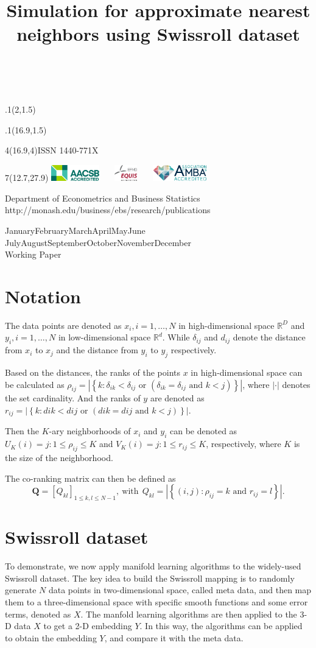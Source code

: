\documentclass[11pt,a4paper,]{article}
\title{Simulation for approximate nearest neighbors using Swissroll dataset}
\date{\sf\Date~\Month~\Year}
\makeatletter
\def\Date{\number\day}
\def\Month{\ifcase\month\or
 January\or February\or March\or April\or May\or June\or
 July\or August\or September\or October\or November\or December\fi}
\def\Year{\number\year}
\def\showjel{{\large\textsf{\textbf{JEL classification:}}~\@jel}}
\def\cover{{\sffamily\setcounter{page}{0}
        \thispagestyle{empty}
        \placefig{2}{1.5}{width=5cm}{monash2}
        \placefig{16.9}{1.5}{width=2.1cm}{MBusSchool}
        \begin{textblock}{4}(16.9,4)ISSN 1440-771X\end{textblock}
        \begin{textblock}{7}(12.7,27.9)\hfill
        \includegraphics[height=0.7cm]{AACSB}~~~
        \includegraphics[height=0.7cm]{EQUIS}~~~
        \includegraphics[height=0.7cm]{AMBA}
        \end{textblock}
        \vspace*{2cm}
        \begin{center}\Large
        Department of Econometrics and Business Statistics\\[.5cm]
        \footnotesize http://monash.edu/business/ebs/research/publications
        \end{center}\vspace{2cm}
        \begin{center}
        \fbox{\parbox{14cm}{\begin{onehalfspace}\centering\Huge\vspace*{0.3cm}
                \textsf{\textbf{\expandafter{\@title}}}\vspace{1cm}\par
                \LARGE\@author\end{onehalfspace}
        }}
        \end{center}
        \vfill
                \begin{center}\Large
                \Month~\Year\\[1cm]
                Working Paper \@wp
        \end{center}\vspace*{2cm}}}
\def\pageone{{\sffamily\setstretch{1}%
        \thispagestyle{empty}%
        \vbox to \textheight{%
        \raggedright\baselineskip=1.2cm
     {\fontsize{24.88}{30}\sffamily\textbf{\expandafter{\@title}}}
        \vspace{2cm}\par
        \hspace{1cm}\parbox{14cm}{\sffamily\large\@addresses}\vspace{1cm}\vfill
        \hspace{1cm}{\large\Date~\Month~\Year}\\[1cm]
        \hspace{1cm}\showjel\vss}}}
\def\blindtitle{{\sffamily
     \thispagestyle{plain}\raggedright\baselineskip=1.2cm
     {\fontsize{24.88}{30}\sffamily\textbf{\expandafter{\@title}}}\vspace{1cm}\par
        }}
\def\titlepage{{\cover\newpage\pageone\newpage\blindtitle}}
\let\maketitle\titlepage
\def\placefig#1#2#3#4{\begin{textblock}{.1}(#1,#2)\rlap{\texttt{[image: \#4]}}\end{textblock}}
\makeatother
\begin{document}
\maketitle

\hypertarget{notation}{%
\section{Notation}\label{notation}}

The data points are denoted as \(x_i, i=1,\dots,N\) in high-dimensional space \(\mathbb{R}^D\) and \(y_i, i=1,\dots,N\) in low-dimensional space \(\mathbb{R}^d\). While \(\delta_{ij}\) and \(d_{ij}\) denote the distance from \(x_i\) to \(x_j\) and the distance from \(y_i\) to \(y_j\) respectively.

Based on the distances, the ranks of the points \(x\) in high-dimensional space can be calculated as \(\rho_{ij} =|\left\{k: \delta_{i k}<\delta_{i j} \text { or }\left(\delta_{i k}=\delta_{i j} \text { and } k<j\right)\right\} |\), where \(|\cdot|\) denotes the set cardinality. And the ranks of \(y\) are denoted as \(r_{ij} = |\left\{k: d{i k}<d{i j} \text { or }\left(d{i k}=d{i j} \text { and } k<j\right)\right\} |\).

Then the \(K\)-ary neighborhoods of \(x_i\) and \(y_i\) can be denoted as \(U_K(i) = {j: 1 \leq \rho_{ij} \leq K}\) and \(V_K(i) = {j: 1 \leq r_{ij} \leq K}\), respectively, where \(K\) is the size of the neighborhood.

The co-ranking matrix \autocite{Lee2008-sx} can then be defined as
\[
\mathbf{Q}=\left[Q_{k l}\right]_{1 \leqslant k, l \leqslant N-1}, \ \text{with} \ \  Q_{k l}=|\left\{(i, j): \rho_{i j}=k \text { and } r_{i j}=l\right\}|.
\]

\hypertarget{swissroll-dataset}{%
\section{Swissroll dataset}\label{swissroll-dataset}}

To demonstrate, we now apply manifold learning algorithms to the widely-used Swissroll dataset. The key idea to build the Swissroll mapping is to randomly generate \(N\) data points in two-dimensional space, called meta data, and then map them to a three-dimensional space with specific smooth functions and some error terms, denoted as \(X\). The manfold learning algorithms are then applied to the 3-D data \(X\) to get a 2-D embedding \(Y\). In this way, the algorithms can be applied to obtain the embedding \(Y\), and compare it with the meta data.
\end{document}
